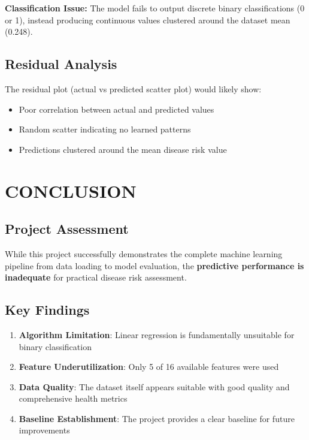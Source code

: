 \documentclass[12pt,a4paper]{article}
\begin{document}
\begin{warningbox}
\textbf{Classification Issue:} The model fails to output discrete binary classifications (0 or 1), instead producing continuous values clustered around the dataset mean (0.248).
\end{warningbox}

\subsection{Residual Analysis}
The residual plot (actual vs predicted scatter plot) would likely show:
\begin{itemize}
    \item Poor correlation between actual and predicted values
    \item Random scatter indicating no learned patterns
    \item Predictions clustered around the mean disease risk value
\end{itemize}

\section{CONCLUSION}

\subsection{Project Assessment}
While this project successfully demonstrates the complete machine learning pipeline from data loading to model evaluation, the \textbf{predictive performance is inadequate} for practical disease risk assessment.

\subsection{Key Findings}
\begin{enumerate}
    \item \textbf{Algorithm Limitation}: Linear regression is fundamentally unsuitable for binary classification
    \item \textbf{Feature Underutilization}: Only 5 of 16 available features were used
    \item \textbf{Data Quality}: The dataset itself appears suitable with good quality and comprehensive health metrics
    \item \textbf{Baseline Establishment}: The project provides a clear baseline for future improvements
\end{enumerate}
\end{document}
